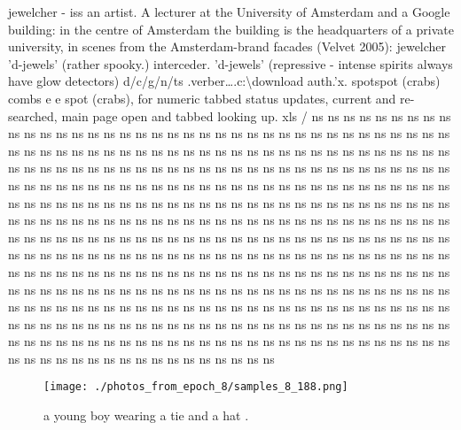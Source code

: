 \documentclass{article}%
\begin{document}
jewelcher {-} iss an artist. A lecturer at the University of Amsterdam and a Google building: in the centre of Amsterdam the building is the headquarters of a private university, in scenes from the Amsterdam{-}brand facades (Velvet 2005):\newline%
jewelcher\newline%
'd{-}jewels' (rather spooky.) interceder. 'd{-}jewels' (repressive {-} intense spirits always have glow detectors)\newline%
d/c/g/n/ts .verber….c:\textbackslash{}download auth.'x.\newline%
spotspot (crabs) combs e e\newline%
spot (crabs), for numeric tabbed status updates, current and re{-}searched, main page open and tabbed looking up.\newline%
xls / ns ns ns ns ns ns ns ns ns ns ns ns ns ns ns ns ns ns ns ns ns ns ns ns ns ns ns ns ns ns ns ns ns ns ns ns ns ns ns ns ns ns ns ns ns ns ns ns ns ns ns ns ns ns ns ns ns ns ns ns ns ns ns ns ns ns ns ns ns ns ns ns ns ns ns ns ns ns ns ns ns ns ns ns ns ns ns ns ns ns ns ns ns ns ns ns ns ns ns ns ns ns ns ns ns ns ns ns ns ns ns ns ns ns ns ns ns ns ns ns ns ns ns ns ns ns ns ns ns ns ns ns ns ns ns ns ns ns ns ns ns ns ns ns ns ns ns ns ns ns ns ns ns ns ns ns ns ns ns ns ns ns ns ns ns ns ns ns ns ns ns ns ns ns ns ns ns ns ns ns ns ns ns ns ns ns ns ns ns ns ns ns ns ns ns ns ns ns ns ns ns ns ns ns ns ns ns ns ns ns ns ns ns ns ns ns ns ns ns ns ns ns ns ns ns ns ns ns ns ns ns ns ns ns ns ns ns ns ns ns ns ns ns ns ns ns ns ns ns ns ns ns ns ns ns ns ns ns ns ns ns ns ns ns ns ns ns ns ns ns ns ns ns ns ns ns ns ns ns ns ns ns ns ns ns ns ns ns ns ns ns ns ns ns ns ns ns ns ns ns ns ns ns ns ns ns ns ns ns ns ns ns ns ns ns ns ns ns ns ns ns ns ns ns ns ns ns ns ns ns ns ns ns ns ns ns ns ns ns ns ns ns ns ns ns ns ns ns ns ns ns ns ns ns ns ns ns ns ns ns ns ns ns ns ns ns ns ns ns ns ns ns ns ns ns ns ns ns ns ns ns ns ns ns ns ns ns ns ns ns

%


\begin{figure}[h!]%
\centering%
\texttt{[image: ./photos\_from\_epoch\_8/samples\_8\_188.png]}%
\caption{a young boy wearing a tie and a hat .}%
\end{figure}

%
\end{document}
